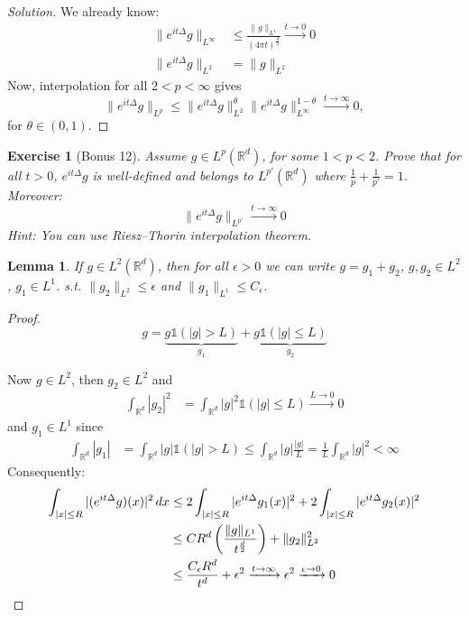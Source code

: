 \documentclass{report}
\theoremstyle{tommy}
\newtheorem{lem}[defn]{Lemma}
\newtheorem{ex}[defn]{Exercise}
\begin{document}
  \begin{proof}[Solution]
    We already know:
    \begin{align*}
      \|e^{it \Delta} g\|_{L^\infty} &\le \frac{\|g\|_{L^1}}{(4 \pi t)^{\frac{d}{2}}} \xrightarrow{t \to 0} 0 \\
      \|e^{it \Delta} g\|_{L^2} &= \|g\|_{L^2}
    \end{align*}
    Now, interpolation for all \(2 < p < \infty\) gives 
    \[\|e^{it \Delta} g\|_{L^p} \le \|e^{it \Delta} g\|_{L^2}^\theta \|e^{it \Delta} g\|_{L^\infty}^{1-\theta} \xrightarrow{t \to \infty} 0,\]
    for \(\theta \in (0,1)\).
  \end{proof}

  \begin{ex}[Bonus 12]
    Assume \(g \in L^p(\mathbb{R}^d)\), for some \(1 < p < 2\). Prove that for all \(t > 0\), \(e^{it \Delta} g\) is well-defined and belongs to \(L^{p'}(\mathbb{R}^d)\) where \(\frac{1}{p} + \frac{1}{p'} = 1\). Moreover:
    \[\|e^{it\Delta} g\|_{L^{p'}} \xrightarrow{t \to \infty} 0\]
    Hint: You can use Riesz–Thorin interpolation theorem.
  \end{ex}

  \begin{lem}
    If \(g \in L^2(\mathbb{R}^d)\), then for all \(\epsilon > 0\) we can write \(g = g_1 + g_2\), \(g, g_2 \in L^2\), \(g_1 \in L^1\). s.t. \(\|g_2\|_{L^2} \le \epsilon\) and \(\|g_1\|_{L^1} \le C_\epsilon\).
  \end{lem}

  \begin{proof}
    \[g = \underbrace{g \mathbb{1}(|g| > L)}_{g_1} + \underbrace{g \mathbb{1}(|g|\le L)}_{g_2}\]
    
    Now \(g \in L^2\), then \(g_2 \in L^2\) and 
    \begin{align*}
      \int_{\mathbb{R}^d} |g_2|^2 &= \int_{\mathbb{R}^d} |g|^2 \mathbb{1}(|g| \le L) \xrightarrow{L \to 0} 0
    \end{align*}
    and \(g_1 \in L^1\) since 
    \begin{align*}
      \int_{\mathbb{R}^d} |g_1| &= \int_{\mathbb{R}^d} |g| \mathbb{1}(|g| > L) \le \int_{\mathbb{R}^d} |g| \frac{|g|}{L} = \frac{1}{L} \int_{\mathbb{R}^d} |g|^2 < \infty
    \end{align*}
    Consequently:
    \begin{align*}
      \int_{|x| \le R} |(e^{it \Delta}g)(x)|^2 \, dx
      &\le 2 \int_{|x| \le R} |e^{it \Delta}g_1(x)|^2 + 2 \int_{|x| \le R} |e^{it \Delta} g_2(x)|^2 \\
      &\le C R^d \left(\frac{\|g\|_{L^1}}{t^{\frac{d}{2}}}\right) + \|g_2\|_{L^2}^2 \\
      &\le \frac{C_\epsilon R^d}{t^d} + \epsilon^2 \xrightarrow{t \to \infty} \epsilon^2 \xrightarrow{\epsilon \to 0} 0 \qedhere
    \end{align*}
  \end{proof}
\end{document}
